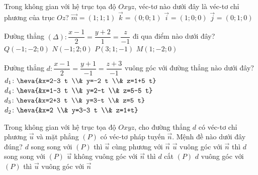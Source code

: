 \begin{ex}%
	Trong không gian với hệ trục tọa độ $Oxyz$, véc-tơ nào dưới đây là véc-tơ chỉ phương của trục $Oz$?
	\choice
	{$\overrightarrow{m}=(1 ; 1 ; 1)$}
	{\True $\overrightarrow{k}=(0 ; 0 ; 1)$}
	{$\overrightarrow{i}=(1 ; 0 ; 0)$}
	{$\overrightarrow{j}=(0 ; 1 ; 0)$}
\end{ex}

\begin{ex}%
	Đường thẳng $(\Delta)\colon \dfrac{x-1}{2}=\dfrac{y+2}{1}=\dfrac{z}{-1}$ đi qua điểm nào dưới đây?
	\choice
	{$Q(-1 ;-2 ; 0)$}
	{$N(-1 ; 2 ; 0)$}
	{$P(3 ; 1 ;-1)$}
	{\True $M(1 ;-2 ; 0)$}
\end{ex}

\begin{ex}%
	Đường thẳng $d\colon \dfrac{x-1}{2}=\dfrac{y+1}{-1}=\dfrac{z+3}{-1}$ vuông góc với đường thẳng nào dưới đây?
	\choice
	{$d_1\colon \heva{&x=2-3 t \\& y=-2 t \\& z=1+5 t}$}
	{\True $d_4\colon \heva{&x=1-3 t \\& y=2-t \\& z=5-5 t}$}
	{$d_3\colon \heva{&x=2+3 t \\& y=3-t \\& z=5 t}$}
	{$d_2\colon \heva{&x=2 \\& y=3-3 t \\& z=1+t}$}
\end{ex}

\begin{ex}%
	Trong không gian với hệ trục tọa độ $Oxyz$, cho đường thẳng $d$ có véc-tơ chỉ phương $\overrightarrow{u}$ và mặt phẳng $(P)$ có véc-tơ pháp tuyến $\overrightarrow{n}$. Mệnh đề nào dưới đây đúng?
	\choice
	{$d$ song song với $(P)$ thì $\overrightarrow{u}$ cùng phương với $\overrightarrow{n}$}
	{$\overrightarrow{u}$ vuông góc với $\overrightarrow{n}$ thì $d$ song song với $(P)$}
	{\True $\overrightarrow{u}$ không vuông góc với $\overrightarrow{n}$ thì $d$ cắt $(P)$}
	{$d$ vuông góc với $(P)$ thì $\overrightarrow{u}$ vuông góc với $\overrightarrow{n}$}
\end{ex}

